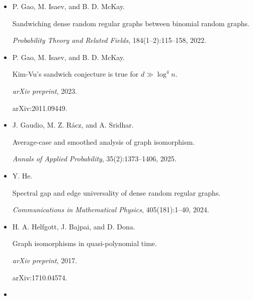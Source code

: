 \documentclass[10pt,a4paper]{article}
\begin{document}
\begin{itemize}
In \emph{Proceedings of the Fourteenth Annual ACM-SIAM Symposium on
Discrete Algorithms (SODA’20)}, pages 690–701, 2020.





\item[] 
[23]

P. Gao, M. Isaev, and B. D. McKay.


Sandwiching dense random regular graphs between binomial random
graphs.


\emph{Probability Theory and Related Fields}, 184(1–2):115–158,
2022.





\item[] 
[24]

P. Gao, M. Isaev, and B. D. McKay.


Kim-Vu’s sandwich conjecture is true for $d\gg\log^{4}n$.


\emph{arXiv preprint}, 2023.


arXiv:2011.09449.





\item[] 
[25]

J. Gaudio, M. Z. Rácz, and A. Sridhar.


Average-case and smoothed analysis of graph isomorphism.


\emph{Annals of Applied Probability}, 35(2):1373–1406, 2025.





\item[] 
[26]

Y. He.


Spectral gap and edge universality of dense random regular graphs.


\emph{Communications in Mathematical Physics}, 405(181):1–40, 2024.





\item[] 
[27]

H. A. Helfgott, J. Bajpai, and D. Dona.


Graph isomorphisms in quasi-polynomial time.


\emph{arXiv preprint}, 2017.


arXiv:1710.04574.





\item[] 
[28]


\end{itemize}
\end{document}
